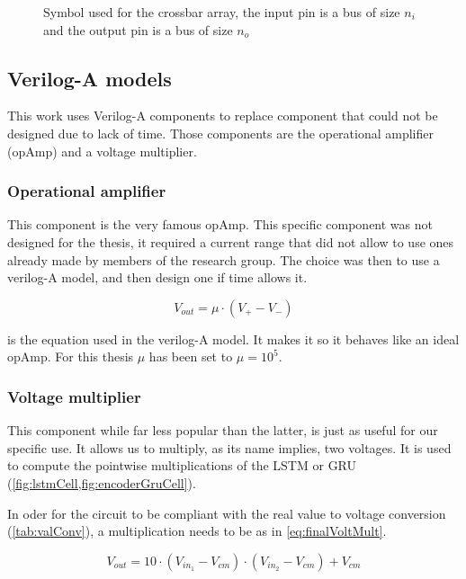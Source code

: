 \begin{figure}[t]
  \centering
  
  \caption{Symbol used for the crossbar array, the input pin is a bus of size $n_i$ and the output pin is a bus of size $n_o$}
  \label{sym:xbar}
\end{figure}

\subsection{Verilog-A models}

This work uses Verilog-A components to replace component that could not be designed due to lack of time. Those components are the operational amplifier (opAmp) and a voltage multiplier.

\subsubsection{Operational amplifier}

This component is the very famous \ac{opAmp}. This specific component was not designed for the thesis, it required a current range that did not allow to use ones already made by members of the research group. The choice was then to use a verilog-A model, and then design one if time allows it.

\begin{equation}
  \label{eq:opAmp}
  V_{out}=\mu \cdot (V_+-V_-)
\end{equation}

 is the equation used in the verilog-A model. It makes it so it behaves like an ideal \ac{opAmp}. For this thesis $\mu$ has been set to $\mu=10^5$.

\subsubsection{Voltage multiplier}

This component while far less popular than the latter, is just as useful for our specific use. It allows us to multiply, as its name implies, two voltages. It is used to compute the pointwise multiplications of the \ac{LSTM} or \ac{GRU} (\cref{fig:lstmCell,fig:encoderGruCell}).

In oder for the circuit to be compliant with the real value to voltage conversion (\cref{tab:valConv}), a multiplication needs to be as in \cref{eq:finalVoltMult}.

\begin{equation}\label{eq:finalVoltMult}
  V_{out}=10\cdot(V_{in_1}-V_{cm})\cdot (V_{in_2}-V_{cm}) + V_{cm}
\end{equation}

